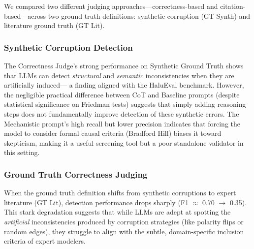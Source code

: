 We compared two different judging approaches---correctness-based and citation-based---across two ground truth definitions: synthetic corruption (GT Synth) and literature ground truth (GT Lit).

\subsubsection{Synthetic Corruption Detection}

The Correctness Judge's strong performance on Synthetic Ground Truth shows that LLMs can detect \textit{structural} and \textit{semantic} inconsistencies when they are artificially induced--- a finding aligned with the HaluEval \cite{li2023halueval} benchmark. However, the negligible practical difference between CoT \cite{kojima2022large} and Baseline prompts (despite statistical significance on Friedman tests) suggests that simply adding reasoning steps does not fundamentally improve detection of these synthetic errors. The Mechanistic prompt's high recall but lower precision indicates that forcing the model to consider formal causal criteria (Bradford Hill) biases it toward skepticism, making it a useful screening tool but a poor standalone validator in this setting. 

\subsubsection{Ground Truth Correctness Judging}

When the ground truth definition shifts from synthetic corruptions to expert literature (GT Lit), detection performance drops sharply (F1 $\approx$ 0.70 $\rightarrow$ 0.35). This stark degradation suggests that while LLMs are adept at spotting the \textit{artificial} inconsistencies produced by corruption strategies (like polarity flips or random edges), they struggle to align with the subtle, domain-specific inclusion criteria of expert modelers.

